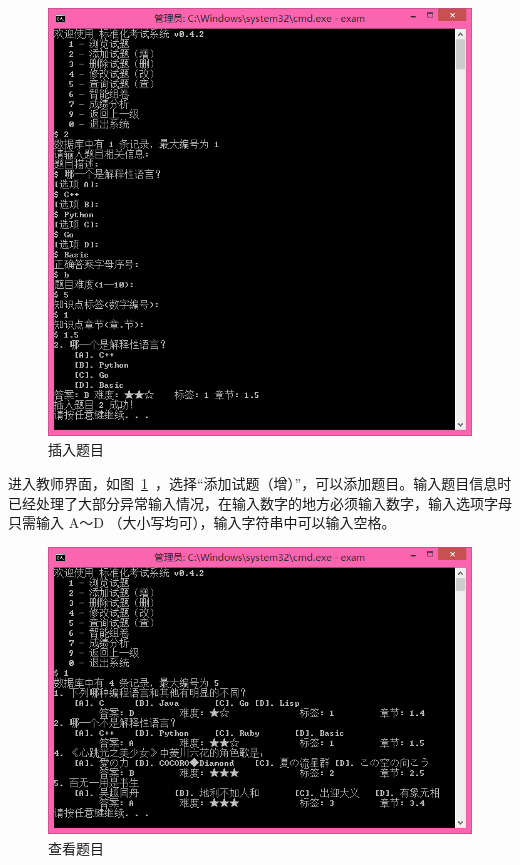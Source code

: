 \begin{figure}[htp]
\includegraphics[width=\textwidth]{image/teacher_insert.png}
\caption{\label{teacher_insert}插入题目}
\end{figure}

进入教师界面，如图~\ref{teacher_insert}~，选择“添加试题（增）”，可以添加题目。输入题目信息时已经处理了大部分异常输入情况，在输入数字的地方必须输入数字，输入选项字母只需输入 A～D （大小写均可），输入字符串中可以输入空格。

\begin{figure}[htp]
\includegraphics[width=\textwidth]{image/teacher_view.png}
\caption{\label{teacher_view}查看题目}
\end{figure}

